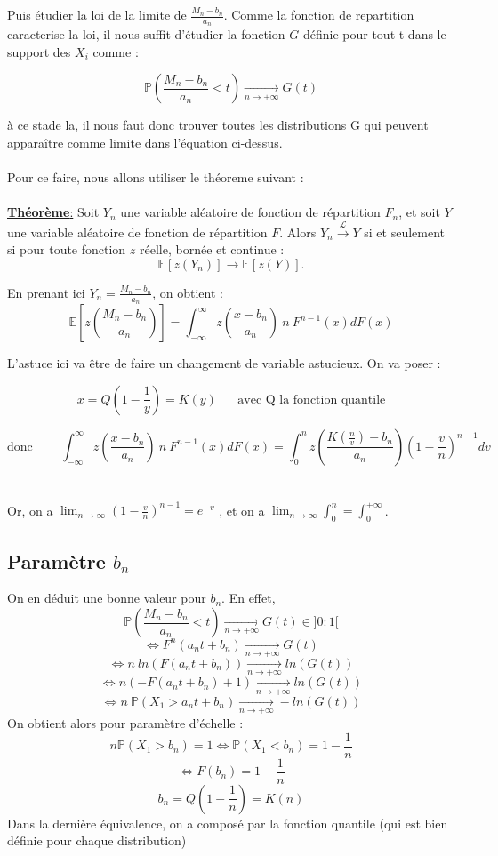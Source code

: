 \documentclass{article}
\begin{document}
Puis étudier la loi de la limite de $\frac{M_n - b_n}{a_n}$. Comme la fonction de repartition caracterise la loi, il nous suffit d'étudier la fonction $G$ définie pour tout t dans le support des $X_i$ comme :

\[
\mathbb{P} \left( \frac{M_n - b_n}{a_n} < t \right) \xrightarrow[n\to +\infty]{} G(t)
\]

à ce stade la, il nous faut donc trouver toutes les distributions G qui peuvent apparaître comme limite dans l’équation ci-dessus.
\\
\\
Pour ce faire, nous allons utiliser le théoreme suivant : 
\\
\\
\underline{\textbf{Théorème}:}
Soit \( Y_n \) une variable aléatoire de fonction de répartition \( F_n \), et soit \( Y \) une variable aléatoire de fonction de répartition \( F \).  
Alors $Y_n \xrightarrow{\mathcal{L} } Y$ si et seulement si pour toute fonction $z$ réelle, bornée et continue :
\[
\mathbb{E}[z(Y_n)] \to \mathbb{E}[z(Y)].
\]

En prenant ici $Y_n = \frac{M_n -b_n}{a_n}$, on obtient :
\[
\mathbb{E}[z(\frac{M_n -b_n}{a_n})] = \int_{-\infty}^{\infty} z(\frac{x-b_n}{a_n}) \: n \:  F^{n-1} (x)dF(x)
\]

L'astuce ici va être de faire un changement de variable astucieux. On va poser : 

\[
x = Q(1-\frac{1}{y}) = K(y) \; \; \; \; \; \; \text{avec Q la fonction quantile}
\]

\[
\text{donc} \;\;\;\;\;\;\;\; \int_{-\infty}^{\infty} z(\frac{x-b_n}{a_n}) \: n \: F^{n-1} (x)dF(x) = \int_{0}^{n} z(\frac{K(\frac{n}{v}) - b_n}{a_n}) ( 1 - \frac{v}{n})^{n-1} dv
\]
\\
\\
Or, on a $\lim_{n \to \infty} ( 1 - \frac{v}{n})^{n-1} = e^{-v}$ , et on a $\lim_{n \to \infty} \int_{0}^{n} = \int_{0}^{+ \infty}$.

\subsection{Paramètre $b_n$}

On en déduit une bonne valeur pour $b_n$. En effet,
\[
\mathbb{P} \left( \frac{M_n - b_n}{a_n} < t \right) \xrightarrow[n\to +\infty]{} G(t) \in ]0:1[
\]
\[
\Longleftrightarrow F^n(a_n t + b_n) \xrightarrow[n\to +\infty]{} G(t)
\]
\[
\Longleftrightarrow n \: ln(F(a_n t + b_n)) \xrightarrow[n\to +\infty]{} ln(G(t))
\]
\[
\Longleftrightarrow n(- F(a_n t + b_n) + 1) \xrightarrow[n\to +\infty]{} ln(G(t))
\]
\[
\Longleftrightarrow n \: \mathbb{P}(X_1 > a_n t + b_n ) \xrightarrow[n\to +\infty]{} - ln(G(t))
\]
On obtient alors pour paramètre d'échelle :
\[
n \mathbb{P}(X_1 > b_n) =1  \Longleftrightarrow \mathbb{P}(X_1 < b_n) = 1 - \frac{1}{n}
\]
\[
\Longleftrightarrow F(b_n) = 1 - \frac{1}{n}
\]
\[
b_n = Q(1-\frac{1}{n}) = K(n)
\]
Dans la dernière équivalence, on a composé par la fonction quantile (qui est bien définie pour chaque distribution)
\\
\end{document}
